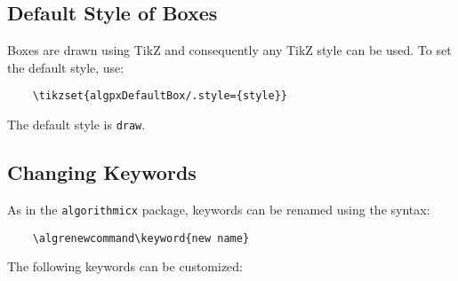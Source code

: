 \documentclass[11pt,a4paper,USenglish]{article}
\begin{document}
\subsection{Default Style of Boxes}\label{sec:defBoxStyle}
Boxes are drawn using TikZ and consequently any TikZ style can be used. To set the default style, use:
\begin{verbatim}
	\tikzset{algpxDefaultBox/.style={style}}
\end{verbatim}
The default style is \verb|draw|.


\subsection{Changing Keywords}
As in the \texttt{algorithmicx} package, keywords can be renamed using the syntax:
\begin{verbatim}
	\algrenewcommand\keyword{new name}
\end{verbatim}
The following keywords can be customized:
\end{document}

